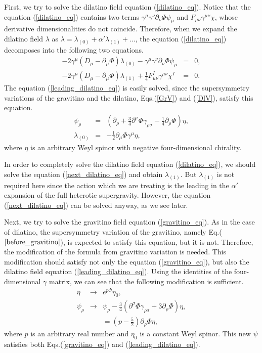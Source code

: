 \documentclass[a4paper,aps, amssymb, preprint, 12pt]{revtex4}
\begin{document}
First, we try to solve the dilatino field equation (\ref{dilatino_eq}).
Notice that the equation (\ref{dilatino_eq}) contains two terms $\gamma^\mu\gamma^\nu\partial_\nu\Phi\psi_\mu$ and  $F_{\mu\nu}\gamma^{\mu\nu}\chi$, whose derivative dimensionalities do not coincide.
Therefore, when we expand the dilatino field $\lambda$ as $\lambda=\lambda_{(0)}+\alpha'\lambda_{(1)}+\ldots $, the equation (\ref{dilatino_eq}) decomposes into the following two equations.
\begin{eqnarray}
-2\gamma^\mu\left(D_\mu-\partial_\mu\Phi\right)\lambda_{(0)}-\gamma^\mu\gamma^\nu\partial_\nu\Phi\psi_\mu &=& 0, \label{leading_dilatino_eq} \\
-2\gamma^\mu\left(D_\mu-\partial_\mu\Phi\right)\lambda_{(1)}+\frac{1}{4}F^I_{\mu\nu}\gamma^{\mu\nu}\chi^I &=& 0. \label{next_dilatino_eq}
\end{eqnarray}
The equation (\ref{leading_dilatino_eq}) is easily solved, since the supersymmetry variations of the gravitino and the dilatino, Eqs.(\ref{GrV}) and (\ref{DlV}), satisfy this equation.
\begin{eqnarray} 
\psi_\rho &=& 
\left(\partial_\rho+\frac{3}{4}\partial^\sigma\Phi\gamma_{\rho\sigma}- \frac{1}{4}\partial_\rho\Phi\right)\eta, \label{before_gravitino} \\
\lambda_{(0)} &=& 
-\frac{1}{2}\partial_\mu\Phi\gamma^\mu\eta, \label{dilatino_sol}
\end{eqnarray}
where $\eta$ is an arbitrary Weyl spinor with negative four-dimensional chirality.

In order to completely solve the dilatino field equation (\ref{dilatino_eq}), we should solve the equation (\ref{next_dilatino_eq}) and obtain $\lambda_{(1)}$.
But $\lambda_{(1)}$ is not required here since the action which we are treating is the leading in the $\alpha'$ expansion of the full heterotic supergravity.
However, the equation (\ref{next_dilatino_eq}) can be solved anyway, as we see later.

Next, we try to solve the gravitino field equation (\ref{gravitino_eq}).
As in the case of dilatino, the supersymmetry variation of the gravitino, namely Eq.($\ref{before_gravitino}$), is expected to satisfy this equation, but it is not.
Therefore, the modification of the formula from gravitino variation is needed.
This modification should satisfy not only the equation (\ref{gravitino_eq}), but also the dilatino field equation (\ref{leading_dilatino_eq}).
Using the identities of the four-dimensional $\gamma$ matrix, we can see that the following modification is sufficient.
\begin{eqnarray}
\eta &\to& e^{p\Phi}\eta_0,\\
\psi_\rho 
&\to& \psi_\rho - \frac{3}{4}\left(\partial^\sigma\Phi\gamma_{\rho\sigma}+3\partial_\rho\Phi\right)\eta, \nonumber \\
&&{}=\left(p-\frac{5}{2}\right)\partial_\rho\Phi\eta, \label{gravitino_sol}
\end{eqnarray}
where $p$ is an arbitrary real number and $\eta_0$ is a constant Weyl spinor.
This new $\psi$ satisfies both Eqs.(\ref{gravitino_eq}) and (\ref{leading_dilatino_eq}).
\end{document}
